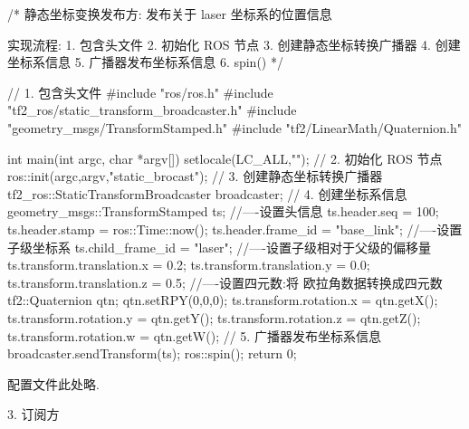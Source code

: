 \documentclass[openany, fontset=windowsold]{ctexbook}
\theoremstyle{kaiti}
\theoremstyle{normal}
\begin{document}
\begin{cpp}
  /* 
      静态坐标变换发布方:
          发布关于 laser 坐标系的位置信息 

      实现流程:
          1. 包含头文件
          2. 初始化 ROS 节点
          3. 创建静态坐标转换广播器
          4. 创建坐标系信息
          5. 广播器发布坐标系信息
          6. spin()
  */

  // 1. 包含头文件
  #include "ros/ros.h"
  #include "tf2_ros/static_transform_broadcaster.h"
  #include "geometry_msgs/TransformStamped.h"
  #include "tf2/LinearMath/Quaternion.h"

  int main(int argc, char *argv[])
  {
      setlocale(LC_ALL,"");
      // 2. 初始化 ROS 节点
      ros::init(argc,argv,"static_brocast");
      // 3. 创建静态坐标转换广播器
      tf2_ros::StaticTransformBroadcaster broadcaster;
      // 4. 创建坐标系信息
      geometry_msgs::TransformStamped ts;
      //----设置头信息
      ts.header.seq = 100;
      ts.header.stamp = ros::Time::now();
      ts.header.frame_id = "base_link";
      //----设置子级坐标系
      ts.child_frame_id = "laser";
      //----设置子级相对于父级的偏移量
      ts.transform.translation.x = 0.2;
      ts.transform.translation.y = 0.0;
      ts.transform.translation.z = 0.5;
      //----设置四元数:将 欧拉角数据转换成四元数
      tf2::Quaternion qtn;
      qtn.setRPY(0,0,0);
      ts.transform.rotation.x = qtn.getX();
      ts.transform.rotation.y = qtn.getY();
      ts.transform.rotation.z = qtn.getZ();
      ts.transform.rotation.w = qtn.getW();
      // 5. 广播器发布坐标系信息
      broadcaster.sendTransform(ts);
      ros::spin();
      return 0;
  }
\end{cpp}

配置文件此处略.

3. 订阅方
\end{document}
